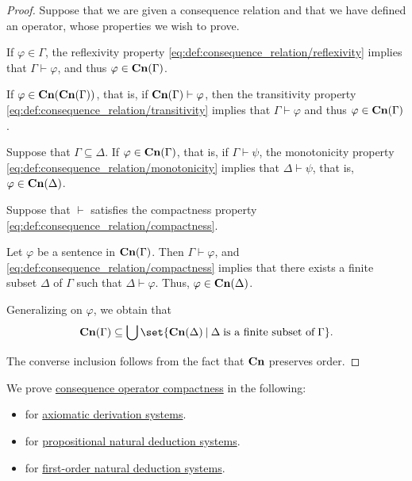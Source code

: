 \begin{proof}
   Suppose that we are given a consequence relation and that we have defined an operator, whose properties we wish to prove.

   If \( \varphi \in \Gamma \), the reflexivity property \eqref{eq:def:consequence_relation/reflexivity} implies that \( \Gamma \vdash \varphi \), and thus \( \varphi \in \op*{Cn}(\Gamma) \).

   If \( \varphi \in \op*{Cn}(\op*{Cn}(\Gamma)) \), that is, if \( \op*{Cn}(\Gamma) \vdash \varphi \), then the transitivity property \eqref{eq:def:consequence_relation/transitivity} implies that \( \Gamma \vdash \varphi \) and thus \( \varphi \in \op*{Cn}(\Gamma) \).

   Suppose that \( \Gamma \subseteq \Delta \). If \( \varphi \in \op*{Cn}(\Gamma) \), that is, if \( \Gamma \vdash \psi \), the monotonicity property \eqref{eq:def:consequence_relation/monotonicity} implies that \( \Delta \vdash \psi \), that is, \( \varphi \in \op*{Cn}(\Delta) \).

   Suppose that \( {\vdash} \) satisfies the compactness property \eqref{eq:def:consequence_relation/compactness}.

  Let \( \varphi \) be a sentence in \( \op*{Cn}(\Gamma) \). Then \( \Gamma \vdash \varphi \), and \eqref{eq:def:consequence_relation/compactness} implies that there exists a finite subset \( \Delta \) of \( \Gamma \) such that \( \Delta \vdash \varphi \). Thus, \( \varphi \in \op*{Cn}(\Delta) \).

  Generalizing on \( \varphi \), we obtain that
  \begin{equation*}
    \op*{Cn}(\Gamma) \subseteq \bigcup\set{ \op*{Cn}(\Delta) \given \Delta \T{is a finite subset of} \Gamma }.
  \end{equation*}

  The converse inclusion follows from the fact that \( \op*{Cn} \) preserves order.
\end{proof}

\begin{remark}\label{rem:logical_compactness_theorems}
  We prove \hyperref[def:consequence_operator/compactness]{consequence operator compactness} in the following:
  \begin{itemize}
    \item {} for \hyperref[def:axiomatic_derivation_system]{axiomatic derivation systems}.
    \item {} for \hyperref[def:propositional_natural_deduction_systems]{propositional natural deduction systems}.
    \item {} for \hyperref[def:first_order_natural_deduction_system]{first-order natural deduction systems}.
  \end{itemize}
\end{remark}

